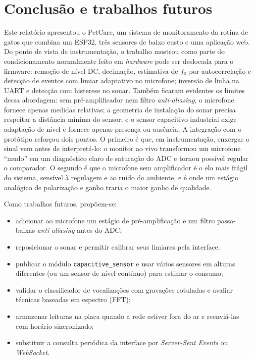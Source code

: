 \section{Conclusão e trabalhos futuros}
\label{sec:conclusao}

Este relatório apresentou o PetCare, um sistema de monitoramento da rotina de gatos que combina um ESP32, três sensores de baixo custo e uma aplicação web. Do ponto de vista de instrumentação, o trabalho mostrou como parte do condicionamento normalmente feito em \textit{hardware} pode ser deslocada para o firmware: remoção de nível DC, decimação, estimativa de $f_0$ por autocorrelação e detecção de eventos com limiar adaptativo no microfone; inversão de linha na UART e detecção com histerese no sonar. Também ficaram evidentes os limites dessa abordagem: sem pré-amplificador nem filtro \textit{anti-aliasing}, o microfone fornece apenas medidas relativas; a geometria de instalação do sonar precisa respeitar a distância mínima do sensor; e o sensor capacitivo industrial exige adaptação de nível e fornece apenas presença ou ausência. A integração com o protótipo reforçou dois pontos. O primeiro é que, em instrumentação, enxergar o sinal vem antes de interpretá-lo: o monitor ao vivo transformou um microfone ``mudo'' em um diagnóstico claro de saturação do ADC e tornou possível regular o comparador. O segundo é que o microfone sem amplificador é o elo mais frágil do sistema, sensível à regulagem e ao ruído do ambiente, e é onde um estágio analógico de polarização e ganho traria o maior ganho de qualidade. 

Como trabalhos futuros, propõem-se:
\begin{itemize}
  \item adicionar ao microfone um estágio de pré-amplificação e um filtro passa-baixas \textit{anti-aliasing} antes do ADC;
  \item reposicionar o sonar e permitir calibrar seus limiares pela interface;
  \item publicar o módulo \texttt{capacitive\_sensor} e usar vários sensores em alturas diferentes (ou um sensor de nível contínuo) para estimar o consumo;
  \item validar o classificador de vocalizações com gravações rotuladas e avaliar técnicas baseadas em espectro (FFT);
  \item armazenar leituras na placa quando a rede estiver fora do ar e reenviá-las com horário sincronizado;
  \item substituir a consulta periódica da interface por \textit{Server-Sent Events} ou \textit{WebSocket}.
\end{itemize}
